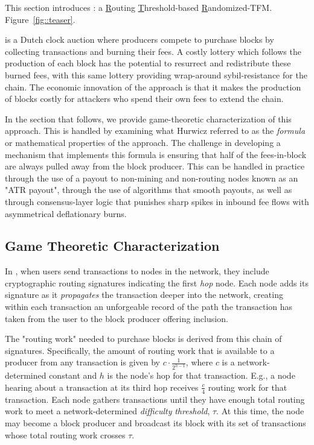 
This section introduces \ourTFM: a \underline{R}outing \underline{T}hreshold-based \underline{R}andomized-TFM. Figure~\ref{fig::teaser}.

\ourTFM is a Dutch clock auction where producers compete to purchase blocks by collecting transactions and burning their fees. A costly lottery which follows the production of each block has the potential to resurrect and redistribute these burned fees, with this same lottery providing wrap-around sybil-resistance for the chain. The economic innovation of the approach is that it makes the production of blocks costly for attackers who spend their own fees to extend the chain.

In the section that follows, we provide game-theoretic characterization of this approach. This is handled by examining what Hurwicz referred to as the \textit{formula} or mathematical properties of the approach. The challenge in developing a mechanism that implements this formula is ensuring that half of the fees-in-block are always pulled away from the block producer. This can be handled in practice through the use of a payout to non-mining and non-routing nodes known as an "ATR payout", through the use of algorithms that smooth payouts, as well as through consensus-layer logic that punishes sharp spikes in inbound fee flows with asymmetrical deflationary burns.

\subsection{Game Theoretic Characterization}

In \ourTFM, when users send transactions to nodes in the network, they include cryptographic routing signatures indicating the first \emph{hop} node. Each node adds its signature as it \emph{propagates} the transaction deeper into the network, creating within each transaction an unforgeable record of the path the transaction has taken from the user to the block producer offering inclusion.

The "routing work" needed to purchase blocks is derived from this chain of signatures. Specifically, the amount of routing work that is available to a producer from any transaction is given by $c\cdot \frac{1}{2^{h-1}}$, where $c$ is a network-determined constant and $h$ is the node's hop for that transaction. E.g., a node hearing about a transaction at its third hop receives $\frac{c}{4}$ routing work for that transaction. Each node gathers transactions until they have enough total routing work to meet a network-determined \textit{difficulty} \textit{threshold}, $\tau$. At this time, the node may become a block producer and broadcast its block with its set of transactions whose total routing work crosses $\tau$.

